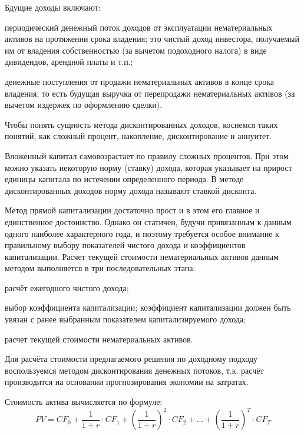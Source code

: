 Бдущие доходы включают:
\begin{list}{}{\leftmargin=1.5cm}
	\item периодический денежный поток доходов от эксплуатации нематериальных активов на протяжении срока владения; это чистый доход инвестора, получаемый им от владения собственностью (за вычетом подоходного налога) в виде дивидендов, арендной платы и т.п.; 
	\item денежные поступления от продажи нематериальных активов в конце срока владения, то есть будущая выручка от перепродажи нематериальных активов (за вычетом издержек по оформлению сделки). 
\end{list}

Чтобы понять сущность метода дисконтированных доходов, коснемся таких понятий, как сложный процент, накопление, дисконтирование и аннуитет. 

Вложенный капитал самовозрастает по правилу сложных процентов. При этом можно указать некоторую норму (ставку) дохода, которая указывает на прирост единицы капитала по истечении определенного периода. В методе дисконтированных доходов норму дохода называют ставкой дисконта. 

Метод прямой капитализации достаточно прост и в этом его главное и единственное достоинство. Однако он статичен, будучи привязанным к данным одного наиболее характерного года, и поэтому требуется особое внимание к правильному выбору показателей чистого дохода и коэффициентов капитализации. Расчет текущей стоимости нематериальных активов данным методом выполняется в три последовательных этапа:
\begin{list}{}{\leftmargin=1.5cm}
	\item расчёт ежегодного чистого дохода;
	\item выбор коэффициента капитализации; коэффициент капитализации должен быть увязан с ранее выбранным показателем капитализируемого дохода;
	\item расчет текущей стоимости нематериальных активов. 
\end{list}

Для расчёта стоимости предлагаемого решения по доходному подходу воспользуемся методом дисконтирования денежных потоков, т.к. расчёт производится на основании прогнозирования экономии на затратах.

Стоимость актива вычисляется по формуле:
\begin{equation}
	PV = CF_0 + \frac{1}{1 + r} \cdot CF_1 + \left( \frac{1}{1 + r} \right)^2 \cdot CF_2 + \ldots + \left( \frac{1}{1 + r} \right)^T \cdot CF_T
\end{equation}


